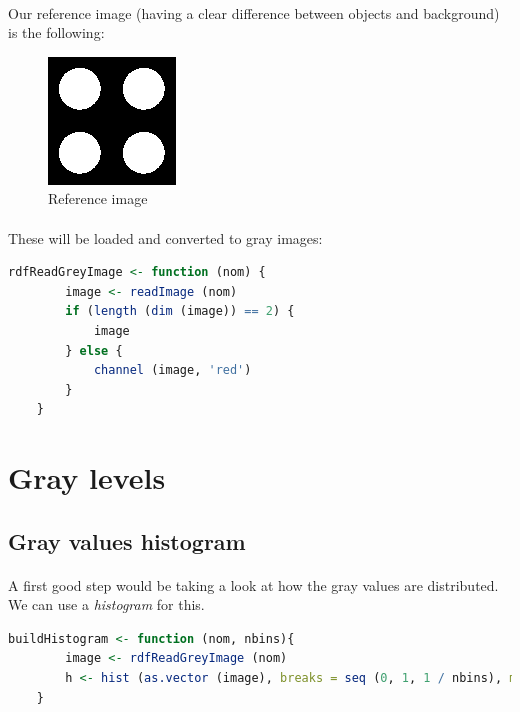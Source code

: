 \paragraph{}
Our reference image (having a clear difference between objects and background) is the following:
\begin{figure}[h]
    \centering
    \includegraphics[scale=0.6]{rdf-masque-ronds.png}
    \caption{Reference image}
    \label{fig-reference-image}
\end{figure}

\paragraph{}
These will be loaded and converted to gray images:
\begin{lstlisting}[language=R, caption=Loading images]
    rdfReadGreyImage <- function (nom) {
        image <- readImage (nom)
        if (length (dim (image)) == 2) {
            image
        } else {
            channel (image, 'red')
        }
    }
\end{lstlisting}

\clearpage

\section{Gray levels}
\subsection{Gray values histogram}
\paragraph{}
A first good step would be taking a look at how the gray values are distributed. We can use a \emph{histogram} for this.
\begin{lstlisting}[language=R, caption=Creating histograms of gray values]
    buildHistogram <- function (nom, nbins){
        image <- rdfReadGreyImage (nom)
        h <- hist (as.vector (image), breaks = seq (0, 1, 1 / nbins), main = nom)
    }
\end{lstlisting}

